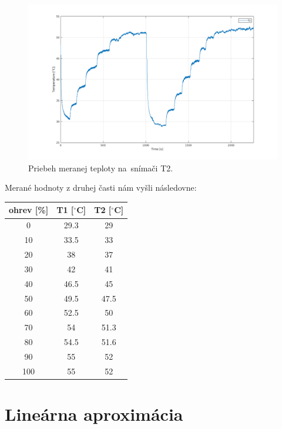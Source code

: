 \documentclass{article}
\begin{document}
\begin{figure}[!htbp]
	\begin{center}
		\includegraphics[width=\textwidth]{./include/teplota_2.png}
		\caption{Priebeh meranej teploty na~snímači T2.}
		\label{fig:mt2}
	\end{center}
	\hfill
\end{figure}

Merané hodnoty z druhej časti nám vyšli následovne:

\begin{center}
\begin{tabular}{ |c|c|c| }
 \hline
 ohrev [\%] & T1 [$^\circ $C] & T2 [$^\circ $C] \\
 \hline
   0 & 29.3 & 29 \\
  10 & 33.5 & 33 \\
  20 & 38 & 37 \\
  30 & 42 & 41\\
  40 & 46.5 & 45\\
  50 & 49.5 & 47.5\\
  60 & 52.5 & 50 \\
  70 & 54 & 51.3 \\
  80 & 54.5 & 51.6 \\
  90 & 55 & 52 \\
 100 & 55 & 52 \\
 \hline
\end{tabular}
\end{center}
\newpage

\section{Lineárna aproximácia}
\label{sec:lin}
\end{document}
